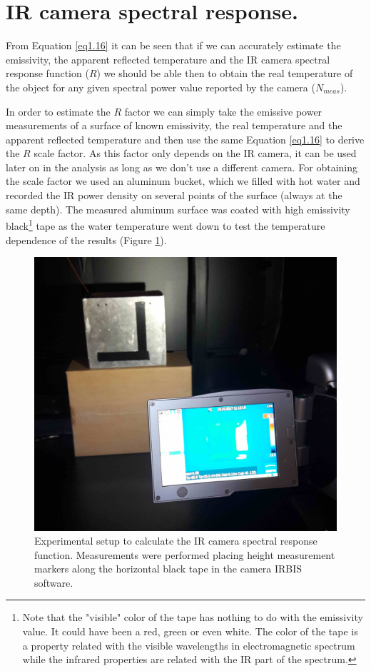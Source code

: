 	\section{IR camera spectral response.}\label{section3.2}
	
		From Equation \ref{eq1.16} it can be seen that if we can accurately estimate the emissivity, the apparent reflected temperature and the IR camera spectral response function ($R$) we should be able then to obtain the real temperature of the object for any given spectral power value reported by the camera ($N_{meas}$). 
		
		In order to estimate the $R$ factor we can simply take the emissive power measurements of a surface of known emissivity, the real temperature and the apparent reflected temperature and then use the same Equation \ref{eq1.16} to derive the $R$ scale factor. As this factor only depends on the IR camera, it can be used later on in the analysis as long as we don’t use a different camera.
		For obtaining the scale factor we used an aluminum bucket, which we filled with hot water and recorded the IR power density on several points of the surface (always at the same depth). The measured aluminum surface was coated with high emissivity black\footnote{{\footnotesize Note that the "visible" color of the tape has nothing to do with the emissivity value. It could have been a red, green or even white. The color of the tape is a property related with the visible wavelengths in electromagnetic spectrum while the infrared properties are related with the IR part of the spectrum.}} tape as the water temperature went down to test the temperature dependence of the results (Figure \ref{fig3.1}).
		
		\begin{figure}[ht!]
			\centering
			\captionsetup{justification=centering,margin=2cm}
			\includegraphics[scale=0.10]{Figures/Chapter03/CameraAndBucket.jpg}
			\caption{Experimental setup to calculate the IR camera spectral response function. Measurements were performed placing height measurement markers along the horizontal black tape in the camera IRBIS software.}\label{fig3.1}
		\end{figure}
		
